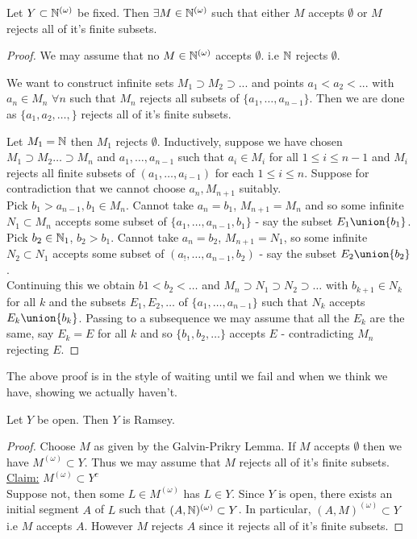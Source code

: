 \documentclass[a4paper]{article}
\newcommand{\Nomega}{\N^{(\omega)}}
\newcommand{\Momega}{M^{(\omega)}}
\begin{document}
  \begin{lem}
    Let $Y \subset \mathbb{N}^{(\omega)}$ be fixed. Then $\exists M \in \mathbb{N}^{( \omega )}$
    such  that either $M$ accepts $\emptyset$ or $M$ rejects all of it's finite
    subsets.
  \end{lem}
  \begin{proof}
    We may assume that no $M \in \Nomega$ accepts $\emptyset$. i.e $\mathbb{N}$ rejects
    $\emptyset$.
    \begin{idea}
      We want to construct infinite sets $M_1 \supset M_2 \supset ...$ and
      points $a_1 < a_2 < ...$ with $a_{n} \in M_n$ $\forall n$ such that
      $M_n$ rejects all subsets of $\{a_1, \dots, a_{n-1}\}$. Then we are done
      as $\{a_1, a_2, \dots,\}$ rejects all of it's finite subsets.
    \end{idea}
    Let $M_1 = \mathbb{N}$ then $M_1$ rejects $\emptyset$. Inductively, suppose we have
    chosen $M_1 \supset M_2 \dots \supset M_n$ and $a_1, \dots, a_{n-1}$ such
    that $a_i \in M_i$ for all $1 \leq i \leq n-1$ and $M_i$ rejects all finite
    subsets of $(a_1, \dots, a_{i-1})$ for each $1 \leq i \leq n$. Suppose for
    contradiction that we cannot choose $a_n, M_{n+1}$ suitably.\\
    Pick $b_1 > a_{n-1}, b_1 \in M_n$. Cannot take $a_n = b_1$, $M_{n+1} = M_n$
    and so some infinite $N_1 \subset M_n$ accepts some subset of $\{a_1, \dots,
    a_{n-1}, b_1\}$ - say the subset $E_1 \union \{b_1\}$.\\
    Pick $b_2 \in \mathbb{N}_1$, $b_2 > b_1$. Cannot take $a_n = b_2$, $M_{n+1} = N_1$,
    so some infinite $N_2 \subset N_1$ accepts some subset of $(a_!, \dots,
    a_{n-1}, b_2)$ - say the subset $E_2 \union \{b_2\}$.\\
    Continuing this we obtain $b1 < b_2 < \dots$ and $M_n \supset N_1 \supset
    N_2 \supset \dots$ with $b_{k+1} \in N_k$ for all $k$ and the subsets $E_1,
    E_2, \dots$ of $\{a_1, \dots, a_{n-1}\}$ such that $N_k$ accepts $E_k \union
    \{b_k\}$. Passing to a subsequence we may assume that all the $E_k$ are the
    same, say $E_k = E$ for all $k$ and so $\{b_1, b_2, \dots \}$ accepts $E$ -
    contradicting $M_n$ rejecting $E$.
  \end{proof}

  The above proof is in the style of waiting until we fail and when we think we
  have, showing we actually haven't.
  \begin{thm}
    Let $Y$ be open. Then $Y$ is Ramsey.
  \end{thm}
  \begin{proof}
    Choose $M$ as given by the Galvin-Prikry Lemma. If $M$ accepts $\emptyset$
    then we have $\Momega \subset Y$. Thus we may assume that $M$ rejects all of
    it's finite subsets.\\
    \underline{Claim:} $\Momega \subset Y^c$\\
    Suppose not, then some $L \in \Momega$ has $L \in Y$. Since $Y$ is open,
    there exists an initial segment $A$ of $L$ such that $(A, \mathbb{N})^{(\omega)}
    \subset Y$. In particular, $(A, M)^{(\omega)} \subset Y$ i.e $M$ accepts
    $A$. However $M$ rejects $A$ since it rejects all of it's finite subsets.
  \end{proof}
\end{document}
